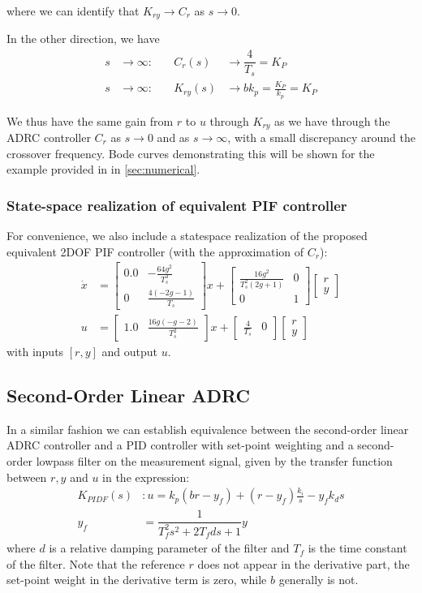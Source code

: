 \documentclass[letterpaper, 10 pt, conference]{ieeeconf}
\newcommand{\bmatrixx}[1]{\begin{bmatrix}#1\end{bmatrix}}
\begin{document}
where we can identify that $K_{ry} \to C_r$ as $s \to 0$.

In the other direction, we have
\begin{align}
	s &\to \infty:  & \quad C_r(s) &\to \dfrac{4}{T_s} = K_P\\
	s &\to \infty:  & \quad K_{ry}(s) &\to b k_p = \frac{K_P}{k_p} = K_P
\end{align}

We thus have the same gain from $r$ to $u$ through $K_{ry}$ as we have through the ADRC controller $C_r$ as $s \to 0$ and as $s \to \infty$, with a small discrepancy around the crossover frequency. Bode curves demonstrating this will be shown for the example provided in \cite{herbst2013simulative} in \cref{sec:numerical}.

\subsubsection{State-space realization of equivalent PIF controller}
For convenience, we also include a statespace realization of the proposed equivalent 2DOF PIF controller (with the approximation of $C_r$):
\begin{align*}
		\dot{x} &= \left[\begin{matrix}0.0 & - \frac{64 g^{2}}{T_{s}^{3}}\\0 & \frac{4 \left(- 2 g - 1\right)}{T_{s}}\end{matrix}\right] x + 		
		\left[\begin{matrix}\frac{16 g^{2}}{T_{s}^{2} \left(2 g + 1\right)} & 0\\0 & 1\end{matrix}\right] \bmatrixx{r \\ y} \\
		u &= \left[\begin{matrix}1.0 & \frac{16 g \left(- g - 2\right)}{T_{s}^{2}}\end{matrix}\right] x + 		
		\left[\begin{matrix}\frac{4}{T_{s}} & 0\end{matrix}\right] \bmatrixx{r \\ y}
\end{align*}
with inputs $[r, y]$ and output $u$.

\subsection{Second-Order Linear ADRC}
In a similar fashion we can establish equivalence between the second-order linear ADRC controller and a PID controller with set-point weighting and a second-order lowpass filter on the measurement signal, given by the transfer function between $r,y$ and $u$ in the expression:
\begin{align}
	K_{PIDF}(s) &: u = k_p (br - y_f) + (r-y_f)\frac{k_i}{s} - y_fk_d s \\
	y_f &= \dfrac{1}{T_f^2s^2 + 2T_f d s + 1} y	
\end{align}
where $d$ is a relative damping parameter of the filter and $T_f$ is the time constant of the filter. Note that the reference $r$ does not appear in the derivative part, the set-point weight in the derivative term is zero, while $b$ generally is not.
\end{document}
